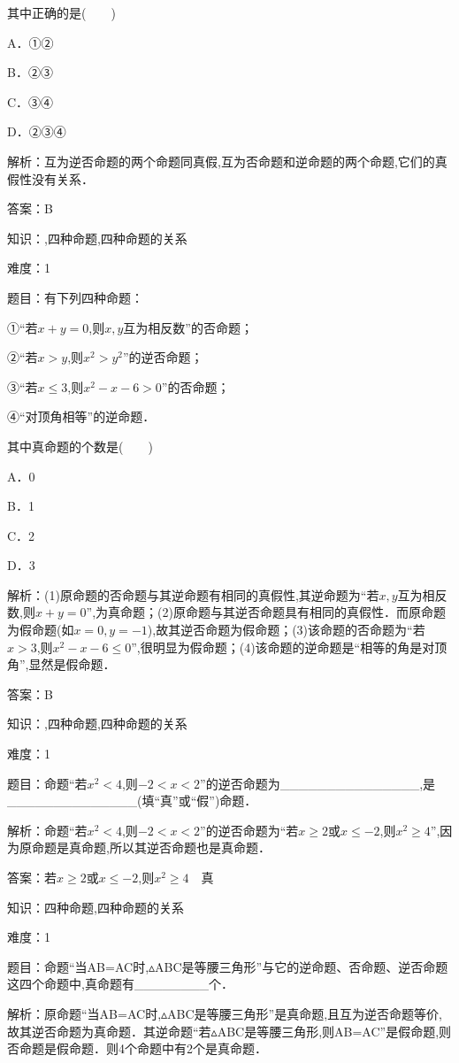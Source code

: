 \documentclass{article} %
\begin{document}
其中正确的是(　　)

A．①②　　　　　 

B．②③

C．③④   

D．②③④

解析：互为逆否命题的两个命题同真假,互为否命题和逆命题的两个命题,它们的真假性没有关系．

答案：B



知识：,四种命题,四种命题的关系

难度：1

题目：有下列四种命题：

①``若$x+y=0$,则$x,y$互为相反数''的否命题；

②``若$x>y$,则$x^{2}>y^{2}$''的逆否命题；

③``若$x\le3$,则$x^{2}-x-6>0$''的否命题；

④``对顶角相等''的逆命题．

其中真命题的个数是(　　)

A．0  

B．1 

C．2  

D．3

解析：(1)原命题的否命题与其逆命题有相同的真假性,其逆命题为``若$x,y$互为相反数,则$x+y=0$'',为真命题；(2)原命题与其逆否命题具有相同的真假性．而原命题为假命题(如$x=0,y=-1$),故其逆否命题为假命题；(3)该命题的否命题为``若$x>3$,则$x^{2}-x-6\le0$'',很明显为假命题；(4)该命题的逆命题是``相等的角是对顶角'',显然是假命题．

答案：B



知识：,四种命题,四种命题的关系

难度：1

题目：命题``若$x^{2}<4$,则$-2<x<2$''的逆否命题为\_\_\_\_\_\_\_\_\_\_\_\_\_\_\_,是\_\_\_\_\_\_\_\_\_\_\_\_\_\_(填``真''或``假'')命题．

解析：命题``若$x^2<4$,则$-2<x<2$''的逆否命题为``若$x\ge2$或$x\le-2$,则$x^{2}\ge4$'',因为原命题是真命题,所以其逆否命题也是真命题．

答案：若$x\ge2$或$x\le-2$,则$x^{2}\ge4$　真



知识：四种命题,四种命题的关系

难度：1

题目：命题``当AB=AC时,${\vartriangle}$ABC是等腰三角形''与它的逆命题、否命题、逆否命题这四个命题中,真命题有\_\_\_\_\_\_\_\_个．

解析：原命题``当AB=AC时,${\vartriangle}$ABC是等腰三角形''是真命题,且互为逆否命题等价,故其逆否命题为真命题．其逆命题``若${\vartriangle}$ABC是等腰三角形,则AB=AC''是假命题,则否命题是假命题．则4个命题中有2个是真命题．
\end{document}
